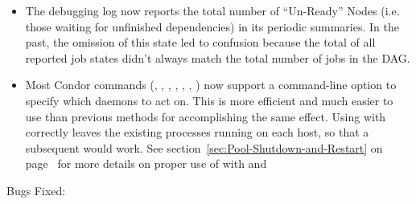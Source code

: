 \begin{itemize}

\item The  debugging log now reports the total number
      of ``Un-Ready'' Nodes (i.e. those waiting for unfinished
      dependencies) in its periodic summaries.  In the past, the
      omission of this state led to confusion because the total of all
      reported job states didn't always match the total number of jobs
      in the DAG.

\item Most Condor commands (, ,
  , , ,
  , ) now support a 
  command-line option to specify which daemons to act on.
  This is more efficient and much easier to use than previous methods
  for accomplishing the same effect.
  Using  with  correctly leaves the existing
   processes running on each host, so that a subsequent
   would work.
  See section~\ref{sec:Pool-Shutdown-and-Restart} on
  page~\pageref{sec:Pool-Shutdown-and-Restart} for more details on
  proper use of  with  and 

\end{itemize}

\noindent Bugs Fixed:

